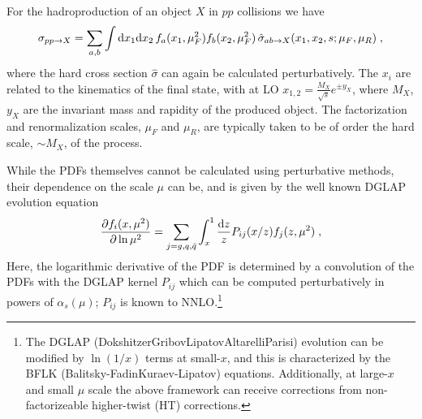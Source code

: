 For the hadroproduction of an object $X$ in $pp$ collisions we have
\begin{equation}
\sigma_{pp\to X}=\sum_{a,b}\int {\rm d}x_1 {\rm d}x_2\, f_a(x_1,\mu_F^2)f_b(x_2,\mu_F^2)\,\hat{\sigma}_{ab\to X}(x_1,x_2,s;\mu_{F},\mu_R)\;,
\end{equation}
where the hard cross section $\hat{\sigma}$ can again be calculated perturbatively. The $x_i$ are related to the kinematics of the final state, with at LO $x_{1,2}=\frac{M_X}{\sqrt{s}}e^{\pm y_X}$, where $M_X$, $y_X$ are the invariant mass and rapidity of the produced object. The factorization and renormalization scales, $\mu_F$ and $\mu_R$, are typically taken to be of order the hard scale, $\sim M_X$, of the process.




While the PDFs themselves cannot be calculated using perturbative methods, their dependence on the scale $\mu$ can be, and is given by the well known
DGLAP evolution equation\cite{Dokshitzer:1977sg,Gribov:1972ri,Altarelli:1977zs}
\begin{equation}\label{eq:dglap}
\frac{\partial f_i(x,\mu^2)}{\partial \ln \mu^2}=\sum_{j=g,q,\bar{q}}\int_x^1 \frac{{\rm d}z}{z}P_{ij}(x/z)f_j(z,\mu^2)\;,
\end{equation}
Here, the logarithmic derivative of the PDF is determined by a convolution
of the PDFs with the DGLAP kernel $P_{ij}$ which can be computed
perturbatively in powers of $\alpha_{s}(\mu)$; $P_{ij}$ is known
to NNLO.\footnote{The DGLAP (Dokshitzer\textendash Gribov\textendash Lipatov\textendash Altarelli\textendash Parisi)
evolution can be modified by $\ln(1/x)$ terms at small-$x$, and
this is characterized by the BFLK (Balitsky-FadinKuraev-Lipatov) equations.\cite{Kuraev:1976ge,Kuraev:1977fs,Balitsky:1978ic}
Additionally, at large-$x$ and small $\mu$ scale the above framework
can receive corrections from non-factorizeable higher-twist (HT) corrections.} 

